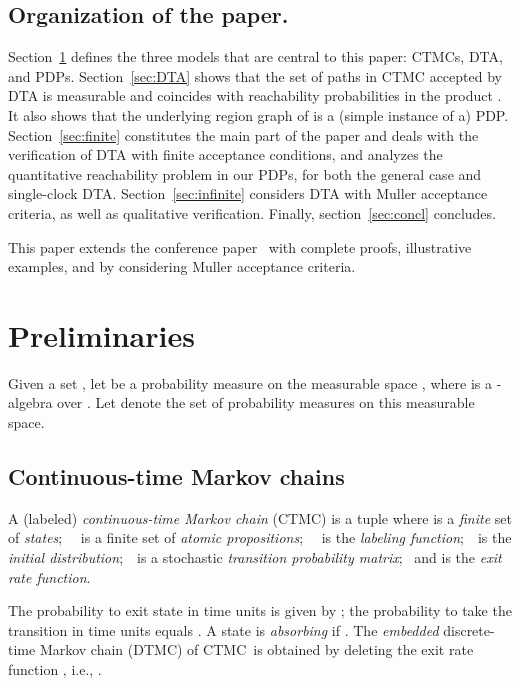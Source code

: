 \documentclass{LMCS}
\newcommand{\<}{\langle}
\renewcommand{\>}{\rangle}
\newcommand{\CTMC}{\textsc{{CTMC}}}
\newcommand{\DTMC}{\textsc{DTMC}}
\begin{document}
\subsection*{Organization of the paper.}
Section~\ref{sec:prelim} defines the three models that are central to this paper: CTMCs,
DTA, and PDPs.
Section~\ref{sec:DTA} shows that the set of paths in CTMC  accepted by DTA
 is measurable and coincides with reachability probabilities in the product
.
It also shows that the underlying region graph of  is a (simple
instance of a) PDP.
Section~\ref{sec:finite} constitutes the main part of the paper and deals with the verification
of DTA with finite acceptance conditions, and analyzes the quantitative reachability problem
in our PDPs, for both the general case and single-clock DTA.
Section~\ref{sec:infinite} considers DTA with Muller acceptance criteria, as well as qualitative
verification.
Finally, section~\ref{sec:concl} concludes.

This paper extends the conference paper~\cite{CHKM09_LICS} with complete proofs,
illustrative examples, and by considering Muller acceptance criteria.

\section{Preliminaries}\label{sec:prelim}

Given a set , let  be a probabi\-li\-ty
measure on the measurable space , where 
is a -algebra over . Let  denote the set of
probability measures on this measurable space.

\subsection{Continuous-time Markov chains}
\begin{defi}[\CTMC] A (labeled) \emph{continuous-time Markov chain} (\CTMC) is a
tuple  where  is a \emph{finite}
set of \emph{states}; \ \  is a finite set of \emph{atomic
propositions}; \ \  is the \emph{labeling
function};\ \  is the \emph{initial
distribution};\ \  is a stochastic
\emph{transition probability matrix}; \ and  is the \emph{exit rate function}.
\end{defi}
The probability to exit state  in  time units is given by ; the probability to take the transition
 in  time units equals .
A state  is \emph{absorbing} if .
The \emph{embedded} discrete-time Markov chain (\DTMC) of \CTMC\
 is obtained by deleting the exit rate function , i.e.,
.
\end{document}
